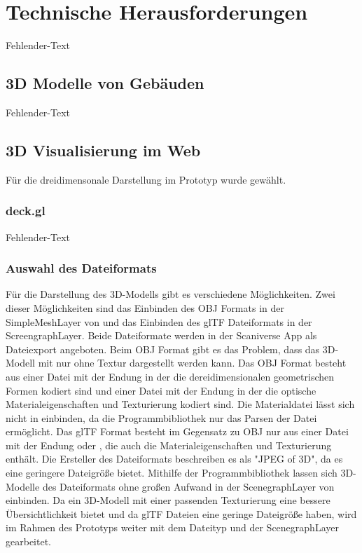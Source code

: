 \newpage
\section{Technische Herausforderungen}
Fehlender-Text

\subsection{3D Modelle von Gebäuden}
Fehlender-Text

\subsection{3D Visualisierung im Web}
Für die dreidimensonale Darstellung im Prototyp wurde \deckgl gewählt.

\subsubsection{deck.gl}
Fehlender-Text

\subsubsection{Auswahl des Dateiformats}

Für die Darstellung des 3D-Modells gibt es verschiedene Möglichkeiten. Zwei dieser Möglichkeiten sind das Einbinden des \ac{OBJ} Formats in der SimpleMeshLayer von \deckgl und das Einbinden des \ac{glTF} Dateiformats in der ScreengraphLayer. Beide Dateiformate werden in der Scaniverse App als Dateiexport angeboten. Beim \ac{OBJ} Format gibt es das Problem, dass das 3D-Modell mit \deckgl nur ohne Textur dargestellt werden kann. Das \ac{OBJ} Format besteht aus einer Datei mit der Endung \obj in der die dereidimensionalen geometrischen Formen kodiert sind und einer Datei mit der Endung \mtl in der die optische Materialeigenschaften und Texturierung kodiert sind. Die Materialdatei lässt sich nicht in \deckgl einbinden, da die \loadersgl Programmbibliothek nur das Parsen der \obj Datei ermöglicht. Das \ac{glTF} Format besteht im Gegensatz zu \ac{OBJ} nur aus einer Datei mit der Endung \gltf oder \glb, die auch die Materialeigenschaften und Texturierung enthält. Die Ersteller des Dateiformats beschreiben es als "JPEG of 3D", da es eine geringere Dateigröße bietet. Mithilfe der \loadersgl Programmbibliothek lassen sich 3D-Modelle des Dateiformats ohne großen Aufwand in der ScenegraphLayer von \deckgl einbinden. Da ein 3D-Modell mit einer passenden Texturierung eine bessere Übersichtlichkeit bietet und da \ac{glTF} Dateien eine geringe Dateigröße haben, wird im Rahmen des Prototyps weiter mit dem Dateityp und der ScenegraphLayer gearbeitet.

